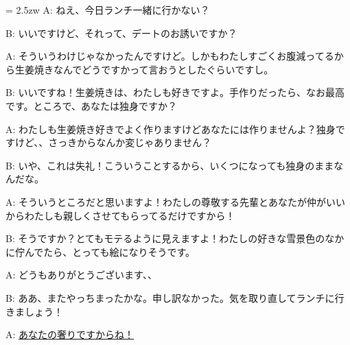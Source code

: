 \documentclass[11pt]{amsart}
\title{}
\author{}
\newenvironment{hangall}[1]{\hangindent = 2.5zw\everypar{\hangindent = 2.5zw}}{}
\begin{document}
\maketitle
\begin{hangall}{}%
A: ねえ、今日ランチ一緒に行かない？

B: いいですけど、それって、デートのお誘いですか？

A: そういうわけじゃなかったんですけど。しかもわたしすごくお腹減ってるから生姜焼きなんでどうですかって言おうとしたぐらいですし。

B: いいですね！生姜焼きは、わたしも好きですよ。手作りだったら、なお最高です。ところで、あなたは独身ですか？

A: わたしも生姜焼き好きでよく作りますけどあなたには作りませんよ？独身ですけど、、さっきからなんか変じゃありません？

B: いや、これは失礼！こういうことするから、いくつになっても独身のままなんだな。

A: そういうところだと思いますよ！わたしの尊敬する先輩とあなたが仲がいいからわたしも親しくさせてもらってるだけですから！

B: そうですか？とてもモテるように見えますよ！わたしの好きな雪景色のなかに佇んでたら、とっても絵になりそうです。

A: どうもありがとうございます、、

B: ああ、またやっちまったかな。申し訳なかった。気を取り直してランチに行きましょう！

A: \ul{あなたの奢りですからね！}\end{hangall}
\end{document}
